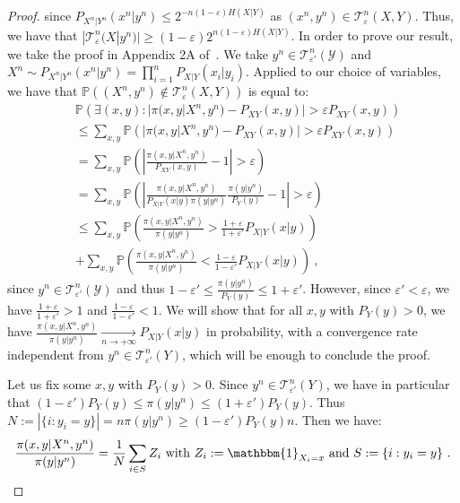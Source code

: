 \begin{proof}
        since $P_{X^n|Y^n}(x^n|y^n) \leq 2^{-n(1-\varepsilon)H(X|Y)}$ as $(x^n,y^n) \in \mathcal{T}^n_{\varepsilon}(X,Y)$. Thus, we have that $|\mathcal{T}^n_{\varepsilon}(X|y^n)| \geq (1-\varepsilon)2^{n(1-\varepsilon)H(X|Y)}$. In order to prove our result, we take the proof in Appendix 2A of~\cite{GK11}. We take $y^n \in \mathcal{T}^n_{\varepsilon'}(\mathcal{Y})$ and $X^n \sim P_{X^n|Y^n}(x^n|y^n) = \prod_{i=1}^nP_{X|Y}(x_i|y_i)$. Applied to our choice of variables, we have that $\mathbb{P}\left((X^n,y^n) \notin \mathcal{T}^n_{\varepsilon}(X,Y) \right)$ is equal to:
        \begin{equation}
          \begin{aligned}
            &\mathbb{P}\left(\exists (x,y) : |\pi(x,y|X^n,y^n) - P_{XY}(x,y)| > \varepsilon P_{XY}(x,y) \right) \\
            &\leq \sum_{x,y} \mathbb{P}\left(|\pi(x,y|X^n,y^n) - P_{XY}(x,y)| > \varepsilon P_{XY}(x,y) \right) \\
            &= \sum_{x,y} \mathbb{P}\left(\left|\frac{\pi(x,y|X^n,y^n)}{P_{XY}(x,y)} - 1\right| > \varepsilon \right) \\
            &= \sum_{x,y} \mathbb{P}\left(\left|\frac{\pi(x,y|X^n,y^n)}{P_{X|Y}(x|y)\pi(y|y^n)}\frac{\pi(y|y^n)}{P_Y(y)} - 1\right| > \varepsilon \right) \\
            &\leq \sum_{x,y} \mathbb{P}\left(\frac{\pi(x,y|X^n,y^n)}{\pi(y|y^n)} > \frac{1+\varepsilon}{1+\varepsilon'}P_{X|Y}(x|y) \right)\\
            &+ \sum_{x,y} \mathbb{P}\left(\frac{\pi(x,y|X^n,y^n)}{\pi(y|y^n)} < \frac{1-\varepsilon}{1-\varepsilon'}P_{X|Y}(x|y) \right) \ ,
          \end{aligned}
        \end{equation}
        since $y^n \in  \mathcal{T}^n_{\varepsilon'}(\mathcal{Y})$ and thus $1-\varepsilon' \leq \frac{\pi(y|y^n)}{P_Y(y)} \leq 1+\varepsilon'$. However, since $\varepsilon' < \varepsilon$, we have $\frac{1+\varepsilon}{1+\varepsilon'} > 1$ and $\frac{1-\varepsilon}{1-\varepsilon'} < 1$. We will show that for all $x,y$ with $P_Y(y) > 0$, we have $\frac{\pi(x,y|X^n,y^n)}{\pi(y|y^n)} \underset{n \rightarrow +\infty}{\rightarrow} P_{X|Y}(x|y)$ in probability, with a convergence rate independent from $y^n \in \mathcal{T}^n_{\varepsilon'}(Y)$, which will be enough to conclude the proof.

        Let us fix some $x,y$ with $P_Y(y) > 0$. Since $y^n \in \mathcal{T}^n_{\varepsilon'}(Y)$, we have in particular that $(1-\varepsilon')P_Y(y) \leq \pi(y|y^n) \leq (1+\varepsilon')P_Y(y)$. Thus $N := |\{i:y_i=y\}| = n\pi(y|y^n) \geq (1-\varepsilon')P_Y(y)n$. Then we have:
        \[ \frac{\pi(x,y|X^n,y^n)}{\pi(y|y^n)} = \frac{1}{N}\sum_{i \in S}Z_i \text{ with }Z_i := \mathbbm{1}_{X_i=x} \text{ and } S := \{i:y_i=y\}\ . \]


\end{proof}
